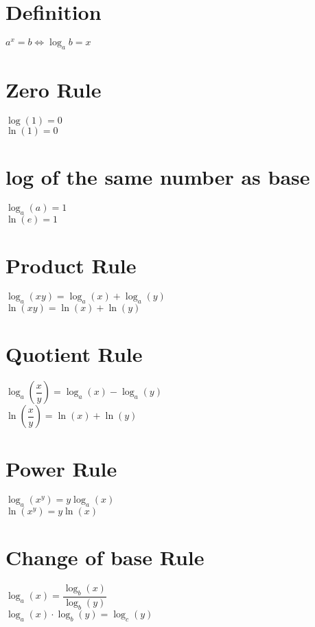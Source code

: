 \documentclass{article}
\begin{document}
\large
\section{Definition}
$a^x = b \Leftrightarrow \log_ab = x$

\section{Zero Rule}
\begin{multicols}{2}
    $\log(1) = 0$\\ $\ln(1) = 0$
\end{multicols}

\section{log of the same number as base}
\begin{multicols}{2}
    $\log_a(a) = 1$ \\ $\ln(e) = 1$
\end{multicols}

\section{Product Rule}
\begin{multicols}{2}
    $\log_a(xy) = \log_a(x) + \log_a(y)$ \\ $\ln(xy) = \ln(x) + \ln(y)$
\end{multicols}

\section{Quotient Rule}
\begin{multicols}{2}
    $\log_a\left(\dfrac{x}{y}\right) = \log_a(x) - \log_a(y)$ \\ $\ln\left(\dfrac{x}{y}\right) = \ln(x) + \ln(y)$
\end{multicols}

\section{Power Rule}
\begin{multicols}{2}
    $\log_a(x^y) = y\log_a(x)$ \\ $\ln(x^y) = y\ln(x)$
\end{multicols}

\section{Change of base Rule}
\begin{multicols}{2}
    $\log_a(x) = \dfrac{\log_b(x)}{\log_b(y)}$ \\ $\log_a(x) \cdot \log_b(y) = \log_c(y)$
\end{multicols}
\end{document}
